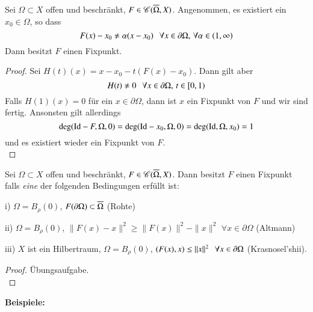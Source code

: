 \begin{theorem}\label{3.14}
    Sei $\Omega\subset X$ offen und beschränkt, $F\in \mathscr C(\overline\Omega,X)$. Angenommen, es existiert ein
    $x_0\in \Omega$, so dass
    \[
        F(x)-x_0\neq \alpha(x-x_0) \hspace{.25cm} \forall x\in \partial \Omega, \, \forall \alpha\in(1,\infty)
    \]
    Dann besitzt $F$ einen Fixpunkt.
\end{theorem}

\begin{proof}
    Sei $H(t)(x)=x-x_0-t(F(x)-x_0)$. Dann gilt aber
    \[
        H(t)\neq 0 \hspace{.25cm} \forall x \in \partial\Omega, \, t\in [0,1)
    \]
    Falls $H(1)(x)=0$ für ein $x\in \partial \Omega$, dann ist $x$ ein Fixpunkt von $F$ und wir
    sind fertig. Ansonsten gilt allerdings
    \[
        \deg(\mathrm{Id}-F,\Omega,0)=\deg(\mathrm{Id}-x_0,\Omega,0)=\deg(\mathrm{Id},\Omega,x_0)=1
    \]
    und es existiert wieder ein Fixpunkt von $F$. 
    \[ \]
\end{proof}

\begin{cor}\label{3.15}
    Sei $\Omega\subset X$ offen und beschränkt, $F\in \mathscr C (\overline \Omega, X)$. Dann besitzt $F$ einen
    Fixpunkt falls \textit{eine} der folgenden Bedingungen erfüllt ist:
    \begin{description}
        \item{i)}
        $\Omega=B_\rho(0)$, $F(\partial \Omega)\subset \overline\Omega$ (Rohte)
        \item{ii)}
        $\Omega=B_\rho(0)$, $\|F(x)-x\|^2\geq \|F(x)\|^2-\|x\|^2$ $\forall x\in \partial \Omega$
        (Altmann)
        \item{iii)}
        $X$ ist ein Hilbertraum, $\Omega=B_\rho(0)$, $(F(x),x)\leq \|x\|^2 \hspace{.25cm} \forall x 
        \in \partial \Omega$ (Krasnosel'shii).
    \end{description}
\end{cor}

\begin{proof}
    Übungsaufgabe. \[ \]
\end{proof}

\noindent \textbf{Beispiele:}

